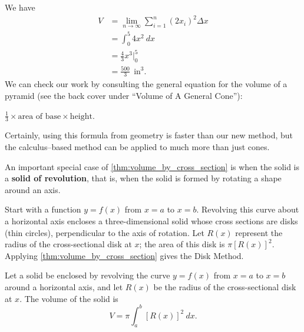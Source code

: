 {We have 
\begin{align*}
	V
	&= \lim_{n\to\infty} \sum_{i=1}^n (2x_i)^2\Delta x\\
	&= \int_0^5 4x^2\ dx\\
	&= \frac43x^3\Big|_0^5 \\
	&=\frac{500}{3}\ %
	\ \text{in}^3.
\end{align*}
We can check our work by consulting the general equation for the volume of a pyramid (see the back cover under ``Volume of A General Cone''): 
\begin{center}
$\frac13\times \text{area of base}\times \text{height}$.
\end{center}
Certainly, using this formula from geometry is faster than our new method, but the calculus--based method can be applied to much more than just cones.}

An important special case of \autoref{thm:volume_by_cross_section} is when the solid is a \textbf{solid of revolution}, that is, when the solid is formed by rotating a shape around an axis.

Start with a function $y=f(x)$ from $x=a$ to $x=b$. Revolving this curve about a horizontal axis encloses a three-dimensional solid whose cross sections are disks (thin circles), perpendicular to the axis of rotation. Let $R(x)$ represent the radius of the cross-sectional disk at $x$; the area of this disk is $\pi [R(x)]^2$. Applying \autoref{thm:volume_by_cross_section} gives the Disk Method.

{Let a solid be enclosed by revolving the curve $y=f(x)$ from $x=a$ to $x=b$ around a horizontal axis, and let $R(x)$ be the radius of the cross-sectional disk at $x$. The volume of the solid is
\[V = \pi \int_a^b [R(x)]^2\ dx.\]}


\clearpage

